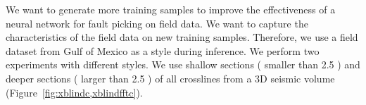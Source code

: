 We want to generate more training samples to improve the effectiveness of a neural network for fault picking on field data. We want to capture the characteristics of the field data on new training samples. Therefore, we use a field dataset from  Gulf of Mexico as a style during inference. We perform two experiments with different styles. We use shallow sections ( smaller than 2.5 ) and deeper sections ( larger than 2.5 ) of all crosslines from a 3D seismic volume (Figure~\ref{fig:xblindc,xblindfftc}).    

